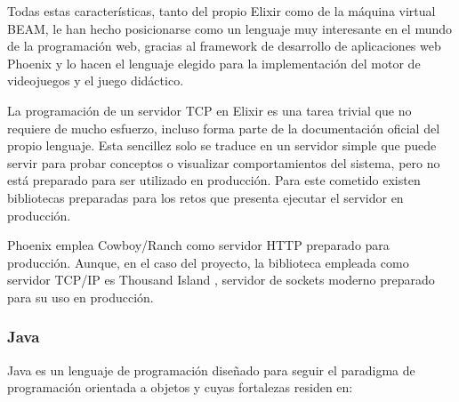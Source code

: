 Todas estas características, tanto del propio Elixir como de la máquina virtual BEAM, le han hecho posicionarse como un lenguaje muy interesante en el mundo de la programación web, gracias al framework de desarrollo de aplicaciones web Phoenix \cite{phoenix} y lo hacen el lenguaje elegido para la implementación del motor de videojuegos y el juego didáctico.

La programación de un servidor TCP en Elixir es una tarea trivial que no requiere de mucho esfuerzo, incluso forma parte de la documentación oficial del propio lenguaje. Esta sencillez solo se traduce en un servidor simple que puede servir para probar conceptos o visualizar comportamientos del sistema, pero no está preparado para ser utilizado en producción. Para este cometido existen bibliotecas preparadas para los retos que presenta ejecutar el servidor en producción.

Phoenix emplea Cowboy/Ranch como servidor HTTP preparado para producción. Aunque, en el caso del proyecto, la biblioteca empleada como servidor TCP/IP es Thousand Island \cite{thousand_island}, servidor de sockets moderno preparado para su uso en producción.

\subsubsection{Java}

Java \cite{java} es un lenguaje de programación diseñado para seguir el paradigma de programación orientada a objetos y cuyas fortalezas residen en:

